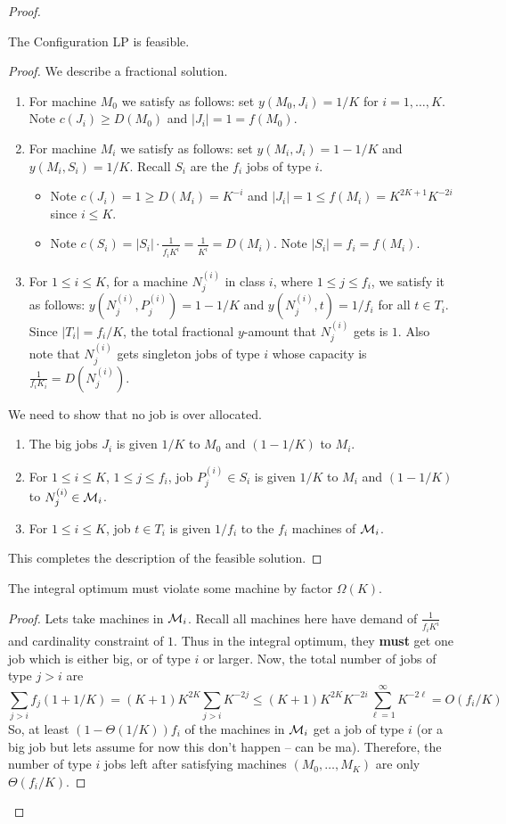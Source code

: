 \documentclass{article}[11pt]
\begin{document}
\begin{proof}
\begin{lemma}
	The Configuration LP is feasible.
\end{lemma}
\begin{proof}
We describe a fractional solution.
\begin{enumerate}
	\item For machine $M_0$ we satisfy as follows: set  $y(M_0,J_i) = 1/K$ for $i=1,\ldots,K$. Note $c(J_i) \geq D(M_0)$ and $|J_i| = 1 = f(M_0)$. 
	\item For machine $M_i$ we satisfy as follows: set $y(M_i,J_i) = 1-1/K$ and $y(M_i,S_i) = 1/K$. Recall $S_i$ are the $f_i$ jobs of type $i$. 
	\begin{itemize}
		\item Note $c(J_i) = 1 \geq D(M_i) = K^{-i}$ and 	$|J_i| = 1 \leq f(M_i) = K^{2K+1}K^{-2i}$ since $i\leq K$.
		\item Note $c(S_i) = |S_i|\cdot \frac{1}{f_iK^i} = \frac{1}{K^i} = D(M_i)$. Note $|S_i| = f_i = f(M_i)$.
	\end{itemize}
\item For $1\leq i\leq K$, for a machine $N^{(i)}_j$ in class $i$, where $1\leq j\leq f_i$, we satisfy it as follows: $y(N^{(i)}_j, P^{(i)}_j) = 1-1/K$ and $y(N^{(i)}_j, t) = 1/f_i$ for all $t\in T_i$.
Since $|T_i| = f_i/K$, the total fractional $y$-amount that $N^{(i)}_j$ gets is $1$. Also note that $N^{(i)}_j$ gets singleton jobs of type $i$ whose capacity is $\frac{1}{f_iK_i} = D(N^{(i)}_j)$.
\end{enumerate}
We need to show that no job is over allocated.
\begin{enumerate}
	\item The big jobs $J_i$ is given $1/K$ to $M_0$ and $(1-1/K)$ to $M_i$.
	\item For $1\leq i\leq K$, $1\leq j\leq f_i$, job $P^{(i)}_j \in S_i$ is given $1/K$ to $M_i$ and $(1-1/K)$ to $N^{(i)}_j\in \mathcal{M}_i$.
	\item For $1\leq i\leq K$, job $t\in T_i$ is given $1/f_i$ to the $f_i$ machines of $\mathcal{M}_i$.
\end{enumerate}
This completes the description of the feasible solution.
\end{proof}
\begin{lemma}
	The integral optimum must violate some machine by factor $\Omega(K)$.
	\end{lemma}
	\begin{proof}
Lets take machines in $\mathcal{M}_i$. Recall all machines here have demand of $\frac{1}{f_iK^i}$ and cardinality constraint of $1$.
Thus in the integral optimum, they {\bf must} get one job which is either big, or of type $i$ or larger. 
Now, the total number of jobs of type $j > i$ are 
\[
\sum_{j>i} f_j(1+1/K) = (K+1)K^{2K} \sum_{j > i} K^{-2j} \leq  (K+1)K^{2K}K^{-2i} \sum_{\ell=1}^\infty K^{-2\ell} = O\left(f_i/K\right)
\]
So, at least $(1 - \Theta(1/K))f_i$ of the machines in $\mathcal{M}_i$ get a job of type $i$ (or a big job but lets assume for now this don't happen -- can be ma).
Therefore, the number of type $i$ jobs left after satisfying machines $(M_0,\ldots,M_K)$ are only $\Theta(f_i/K)$.



\end{proof}
\end{proof}
\end{document}
